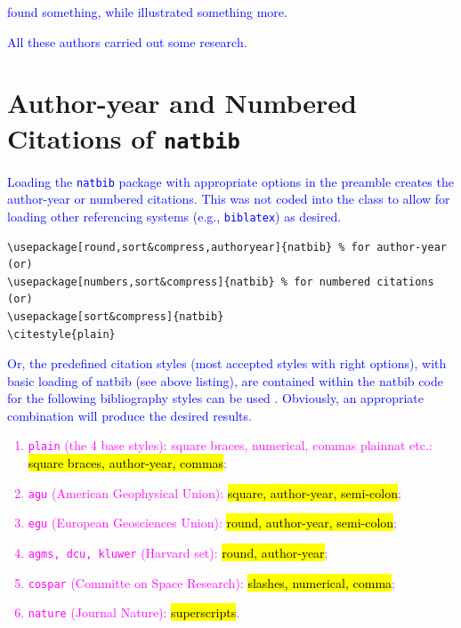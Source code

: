 \documentclass[phd]{ndsu-thesis-2022}
\newcommand\italk[1]{\textcolor{blue}{#1}}  %
\begin{document}
\italk{\citet{calvo2004using} found something, while \citet{bari2016identification} illustrated something more. }

\italk{All these authors \citep{calvo2004using,cannayen2011latex,bari2016identification,sharma2012ndsu,baczkowski1990ndsu} carried out some research.} 

\section{Author-year and Numbered Citations of \texttt{natbib}}
\italk{Loading the \texttt{natbib} package with appropriate options in the preamble creates the author-year or numbered citations. This was not coded into the class to allow for loading other referencing systems (e.g., \texttt{biblatex}) as desired.}

{\singlespacing
\begin{verbatim}
\usepackage[round,sort&compress,authoryear]{natbib} % for author-year
(or)
\usepackage[numbers,sort&compress]{natbib} % for numbered citations
(or)
\usepackage[sort&compress]{natbib} 
\citestyle{plain}
\end{verbatim}
}

\italk{Or, the predefined citation styles (most accepted styles with right options), with basic loading of natbib (see above listing), are contained within the natbib code for the following bibliography styles can be used \citep{daly2010natural}. Obviously, an appropriate combination will produce the desired results.\\}

\vspace{-6ex}
\textcolor{magenta}{
\begin{enumerate}
\item \texttt{plain} (the 4 base styles): square braces, numerical, commas plainnat etc.: \hl{square braces, author-year, commas};
\item \texttt{agu} (American Geophysical Union): \hl{square, author-year, semi-colon};
\item \texttt{egu} (European Geosciences Union): \hl{round, author-year, semi-colon};
\item \texttt{agms, dcu, kluwer} (Harvard set): \hl{round, author-year};
\item \texttt{cospar} (Committe on Space Research): \hl{slashes, numerical, comma};
\item \texttt{nature} (Journal Nature): \hl{superscripts}.
\end{enumerate}
}
\end{document}
